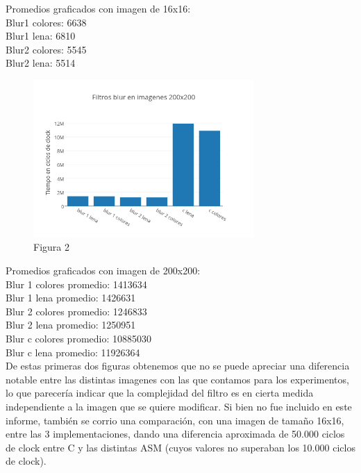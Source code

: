 \documentclass[a4paper]{article}
\begin{document}
Promedios graficados con imagen de 16x16:
\\

Blur1 colores: 6638
\\

Blur1 lena: 6810
\\

Blur2 colores: 5545
\\

Blur2 lena: 5514


\begin{figure}[h]
  \centering
    \includegraphics[width=0.75\textwidth]{imagenes/FiltrosBlurEnImagenes200x200.png}
  \caption{Figura 2}
  \label{fig:graficoblur2}
\end{figure}
 \FloatBarrier


Promedios graficados con imagen de 200x200:
\\

Blur 1 colores promedio: 1413634
\\

Blur 1 lena promedio: 1426631
\\

Blur 2 colores promedio: 1246833
\\

Blur 2 lena promedio: 1250951
\\

Blur c colores promedio: 10885030
\\

Blur c lena promedio: 11926364
\\

De estas primeras dos figuras obtenemos que no se puede apreciar una diferencia notable entre las distintas imagenes con las que contamos para los experimentos, lo que parecería indicar que la complejidad del filtro es en cierta medida independiente a la imagen que se quiere modificar. Si bien no fue incluido en este informe, también se corrio una comparación, con una imagen de tamaño 16x16, entre las 3 implementaciones, dando una diferencia aproximada de 50.000 ciclos de clock entre C y las distintas ASM (cuyos valores no superaban los 10.000 ciclos de clock).
\end{document}
